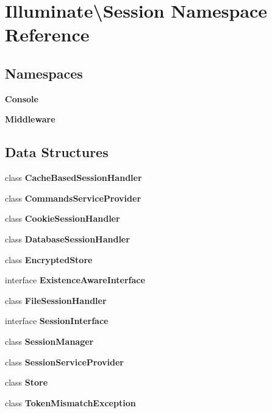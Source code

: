 \section{Illuminate\textbackslash{}Session Namespace Reference}
\label{namespace_illuminate_1_1_session}
\subsection*{Namespaces}
\begin{DoxyCompactItemize}
\item 
 {\bf Console}
\item 
 {\bf Middleware}
\end{DoxyCompactItemize}
\subsection*{Data Structures}
\begin{DoxyCompactItemize}
\item 
class {\bf Cache\+Based\+Session\+Handler}
\item 
class {\bf Commands\+Service\+Provider}
\item 
class {\bf Cookie\+Session\+Handler}
\item 
class {\bf Database\+Session\+Handler}
\item 
class {\bf Encrypted\+Store}
\item 
interface {\bf Existence\+Aware\+Interface}
\item 
class {\bf File\+Session\+Handler}
\item 
interface {\bf Session\+Interface}
\item 
class {\bf Session\+Manager}
\item 
class {\bf Session\+Service\+Provider}
\item 
class {\bf Store}
\item 
class {\bf Token\+Mismatch\+Exception}
\end{DoxyCompactItemize}
